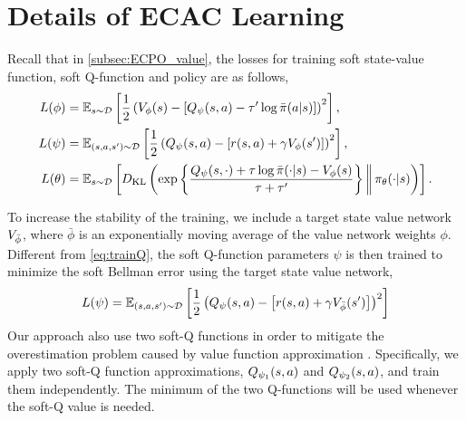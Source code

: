 \section{Details of ECAC Learning}
\label{sec:implementationECAC}

Recall that in \cref{subsec:ECPO_value}, the losses for training soft state-value function, soft Q-function and policy are as follows,
\begin{align}
\label{eq:trainV}
L (\phi) &= {\mathbb{E}}_{s\sim {\mathcal{D}}} \left[ \frac{1}{2} \left( V_{\phi}(s) -  \left[ Q_{\psi}(s,a ) - \tau' \log \bar{\pi}(a|s) \right] \right)^2 \right], \\
\label{eq:trainQ}
L(\psi) &= {\mathbb{E}}_{(s,a,s') \sim {\mathcal{D}}} \left[ \frac{1}{2} \left( Q_{\psi}(s,a) - \left[r(s,a) + \gamma V_{\phi}(s') \right] \right)^2 \right], \\
\label{eq:trainpi}
L(\theta)  &= {\mathbb{E}}_{s \sim {\mathcal{D}}} \left[ D_{\mathrm{KL}} \left( \exp\left\{ \frac{Q_{\psi}(s,\cdot) + \tau \log \bar{\pi}(\cdot|s) - V_{\phi}(s)}{\tau+\tau'} \right\}  \bigg\Vert\, \pi_{\theta}(\cdot | s) \right) \right].
\end{align}

To increase the stability of the training, we include a target state value network $V_{\bar{\phi}}$, where $\bar{\phi}$ is an exponentially moving average of the value network weights $\phi$. 
Different from \cref{eq:trainQ}, the soft Q-function parameters $\psi$ is then trained to minimize the soft Bellman error using the target state value network,
\begin{equation}
L(\psi) = {\mathbb{E}}_{(s,a,s') \sim {\mathcal{D}}} \left[ \frac{1}{2} \left( Q_{\psi}(s,a) - \left[r(s,a) + \gamma V_{\bar{\phi}}(s') \right] \right)^2 \right]
\end{equation}
Our approach also use two soft-Q functions in order to mitigate the overestimation problem caused by value function approximation \citep{haarnoja2018soft,fujimoto2018addressing}. Specifically, we apply two soft-Q function approximations, $Q_{\psi_1}(s,a)$ and $Q_{\psi_2}(s,a)$, and train them independently.  The minimum of the two Q-functions will be used whenever the soft-Q value is needed. 

